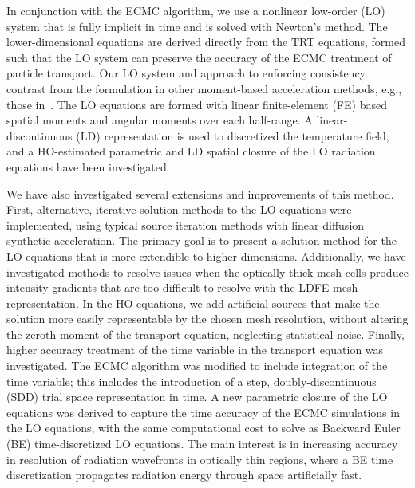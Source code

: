 In conjunction with the ECMC
algorithm, we use a nonlinear
low-order (LO) system that is fully implicit in time and is solved with Newton's method. 
The lower-dimensional equations are derived directly from the TRT equations, formed such that the LO
system can preserve the accuracy of the ECMC treatment of particle transport.  Our LO
system and approach to enforcing consistency contrast from the formulation in other
moment-based acceleration methods, e.g., those in~\cite{rmc,willert,park}. The LO
equations are formed with linear finite-element (FE) based spatial moments and angular
moments over each half-range.  A linear-discontinuous (LD) representation is used to discretized
the temperature field, and a HO-estimated parametric and LD spatial closure of the LO
radiation equations have been investigated.

We have also investigated several extensions and improvements of this method.  First,
alternative, iterative solution methods to the LO equations were implemented, using
typical source iteration methods with linear diffusion synthetic acceleration.  The primary goal is to present a solution
method for the LO equations that is more extendible to higher dimensions.
Additionally, we have investigated methods to resolve issues when the optically
thick mesh cells produce intensity gradients that are too difficult to resolve with the
LDFE mesh representation.   In the HO equations, we add artificial sources that
make the solution more easily representable by the chosen mesh resolution, without
altering the zeroth moment of the transport equation, neglecting statistical noise.
Finally, higher accuracy treatment of the time variable in the transport equation
was investigated.  The ECMC algorithm was modified to include integration
of the time variable; this includes the introduction of a step,
doubly-discontinuous (SDD) trial space representation in time.
A new parametric closure of the LO equations was derived to capture the time accuracy of
the ECMC simulations in the LO equations, with the same computational cost to solve as 
Backward Euler (BE) time-discretized LO equations.
 The main interest is in increasing accuracy in resolution of radiation wavefronts in optically
thin regions, where a BE time discretization propagates radiation energy through space artificially fast.

